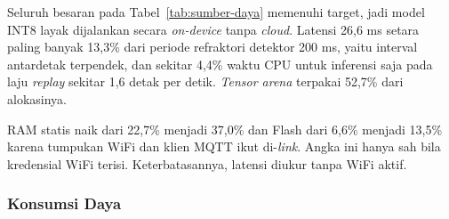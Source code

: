 Seluruh besaran pada Tabel~\ref{tab:sumber-daya} memenuhi target, jadi model INT8 layak dijalankan secara \textit{on-device} tanpa \textit{cloud}. Latensi 26,6 ms setara paling banyak 13,3\% dari periode refraktori detektor 200 ms, yaitu interval antardetak terpendek, dan sekitar 4,4\% waktu CPU untuk inferensi saja pada laju \textit{replay} sekitar 1,6 detak per detik. \textit{Tensor arena} terpakai 52,7\% dari alokasinya.

RAM statis naik dari 22,7\% menjadi 37,0\% dan Flash dari 6,6\% menjadi 13,5\% karena tumpukan WiFi dan klien MQTT ikut di-\textit{link}. Angka ini hanya sah bila kredensial WiFi terisi. Keterbatasannya, latensi diukur tanpa WiFi aktif.

\subsubsection{Konsumsi Daya}


